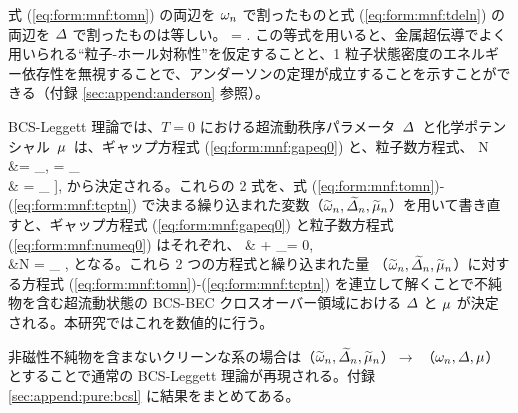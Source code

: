 式 (\ref{eq:form:mnf:tomn}) の両辺を $\omega_n$ で割ったものと式 (\ref{eq:form:mnf:tdeln}) の両辺を $\varDelta$ で割ったものは等しい。
\beq
\frac{\tomn}{\omn} = \frac{\tdeln}{\del}.\label{eq:form:mnf:nonmag}
\eeq
この等式を用いると、金属超伝導でよく用いられる“粒子-ホール対称性”を仮定することと、1 粒子状態密度のエネルギー依存性を無視することで、アンダーソンの定理が成立することを示すことができる（付録 \ref{sec:append:anderson} 参照）。

BCS-Leggett 理論では、$T=0$ における超流動秩序パラメータ~$\varDelta$~と化学ポテンシャル~$\mu$~は、ギャップ方程式 (\ref{eq:form:mnf:gapeq0}) と、粒子数方程式、
\beq
N &= \sum_{\bp,\spin}  = \sum_{\bp} \notag\\
& =  \sum_{\bp} \left[ 1 + \frac{1}{\beta} \sumn \Tr\left[ \tau_3 \bgimppom e^{i\omn \delta}\right] \right], \label{eq:form:mnf:numeq0}
\eeq
から決定される。これらの 2 式を、式 (\ref{eq:form:mnf:tomn})-(\ref{eq:form:mnf:tcptn}) で決まる繰り込まれた変数（$\widetilde{\omega}_n, \widetilde{\varDelta}_n, \widetilde{\mu}_n$）を用いて書き直すと、ギャップ方程式 (\ref{eq:form:mnf:gapeq0}) と粒子数方程式 (\ref{eq:form:mnf:numeq0}) はそれぞれ、
\beq
& + \sum_{\bp} = 0, \label{eq:form:mnf:gapeq}\\
&N = \sum_{\bp} , \label{eq:form:mnf:numeq}
\eeq
となる。これら 2 つの方程式と繰り込まれた量 （$\widetilde{\omega}_n, \widetilde{\varDelta}_n, \widetilde{\mu}_n$）に対する方程式 (\ref{eq:form:mnf:tomn})-(\ref{eq:form:mnf:tcptn}) を連立して解くことで不純物を含む超流動状態の BCS-BEC クロスオーバー領域における $\varDelta$ と $\mu$ が決定される。本研究ではこれを数値的に行う。

非磁性不純物を含まないクリーンな系の場合は（$\widetilde{\omega}_n, \widetilde{\varDelta}_n, \widetilde{\mu}_n$）$\to$ （$\omega_n, \varDelta, \mu$）とすることで通常の BCS-Leggett 理論が再現される。付録 \ref{sec:append:pure:bcsl} に結果をまとめてある。

